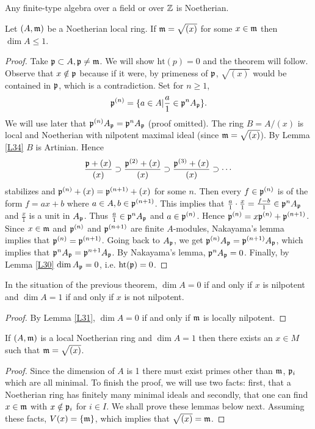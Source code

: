 \documentclass{../mathnotes}
\begin{document}
\begin{rem}
Any finite-type algebra over a field or over $\mathbb{Z}$ is Noetherian.
\end{rem}

\begin{thm}[Hauptidealsatz, v.1]
\label{L36}
Let $(A,\mathfrak m)$ be a Noetherian local ring. If $\mathfrak m=\sqrt{(x)}$ for some $x\in\mathfrak m$ then $\dim A\leq 1$.
\end{thm}
\begin{proof}
Take $\mathfrak p\subset A, \mathfrak p\neq\mathfrak m$. We will show $\text{ht}(p)=0$ and the theorem will follow. Observe that $x\notin\mathfrak p$ because if it were, by primeness of $\mathfrak p$, $\sqrt{(x)}$ would be contained in $\mathfrak p$, which is a contradiction. Set for $n\geq 1$,
\[\mathfrak p^{(n)}=\{a\in A | \frac{a}{1}\in\mathfrak p^nA_\mathfrak p\}.\]
We will use later that $\mathfrak p^{(n)}A_\mathfrak p=\mathfrak p^nA_\mathfrak p$ (proof omitted). The ring $B=A/(x)$ is local and Noetherian with nilpotent maximal ideal (since $\mathfrak m=\sqrt{(x)}$). By Lemma \ref{L34} $B$ is Artinian. Hence
\[\frac{\mathfrak p+(x)}{(x)}\supset\frac{\mathfrak p^{(2)}+(x)}{(x)}\supset\frac{\mathfrak p^{(3)}+(x)}{(x)}\supset\cdots\]
stabilizes and $\mathfrak p^{(n)}+(x)=\mathfrak p^{(n+1)}+(x)$ for some $n$. Then every $f\in\mathfrak p^{(n)}$ is of the form $f=ax+b$ where $a\in A,b\in\mathfrak p^{(n+1)}$. This implies that $\frac{a}{1}\cdot\frac{x}{1}=\frac{f-b}{1}\in\mathfrak p^nA_\mathfrak p$ and $\frac{x}{1}$ is a unit in $A_\mathfrak p$. Thus $\frac{a}{1}\in\mathfrak p^nA_\mathfrak p$ and $a\in\mathfrak p^{(n)}$. Hence $\mathfrak p^{(n)}=x\mathfrak p^{(n)}+\mathfrak p^{(n+1)}$. Since $x\in\mathfrak m$ and $\mathfrak p^{(n)}$ and $\mathfrak p^{(n+1)}$ are finite $A$-modules, Nakayama's lemma implies that $\mathfrak p^{(n)}=\mathfrak p^{(n+1)}$. Going back to $A_\mathfrak p$, we get $\mathfrak p^{(n)}A_\mathfrak p=\mathfrak p^{(n+1)}A_\mathfrak p$, which implies that $\mathfrak p^nA_\mathfrak p=\mathfrak p^{n+1}A_\mathfrak p$. By Nakayama's lemma, $\mathfrak p^nA_\mathfrak p=0$. Finally, by Lemma \ref{L30} $\dim A_\mathfrak p=0$, i.e. $\text{ht}(\mathfrak p)=0$.
\end{proof}

\begin{lem}
\label{L37}
In the situation of the previous theorem, $\dim A=0$ if and only if $x$ is nilpotent and $\dim A=1$ if and only if $x$ is not nilpotent.
\end{lem}
\begin{proof}
By Lemma \ref{L31}, $\dim A=0$ if and only if $\mathfrak m$ is locally nilpotent.
\end{proof}

\begin{lem}
\label{L38}
If $(A,\mathfrak m)$ is a local Noetherian ring and $\dim A=1$ then there exists an $x\in M$ such that $\mathfrak m=\sqrt{(x)}$.
\end{lem}
\begin{proof}
Since the dimension of $A$ is 1 there must exist primes other than $\mathfrak m$, $\mathfrak p_i$ which are all minimal. To finish the proof, we will use two facts: first, that a Noetherian ring has finitely many minimal ideals and secondly, that one can find $x\in\mathfrak m$ with $x\notin\mathfrak p_i$ for $i\in I$. We shall prove these lemmas below next. Assuming these facts, $V(x)=\{\mathfrak m\}$, which implies that $\sqrt{(x)}=\mathfrak m$.
\end{proof}
\end{document}
